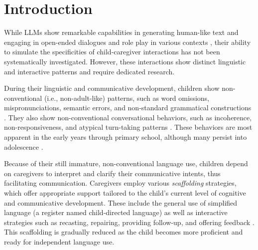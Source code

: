 \graphicspath{{ch5/papers/LLM_benchmark/}}

\section{Introduction}

While LLMs show remarkable capabilities in generating human-like text and engaging in open-ended dialogues and role play in various contexts \citep{feng2024can, yang2024talk2care}, their ability to simulate the specificities of child-caregiver interactions has not been systematically investigated. However, these interactions show distinct linguistic and interactive patterns and require dedicated research. 

During their linguistic and communicative development,  children show non-conventional (i.e., non-adult-like) patterns, such as word omissions, mispronunciations, semantic errors, and non-standard grammatical constructions \citep{bloom1993transition}. They also show non-conventional conversational behaviors, such as incoherence, non-responsiveness, and atypical turn-taking patterns \citep{ninio1996pragmatic}. These behaviors are most apparent in the early years through primary school, although many persist into adolescence \citep{nippold2016later}.  

Because of their still immature, non-conventional language use, children depend on caregivers to interpret and clarify their communicative intents, thus facilitating communication. Caregivers employ various \textit{scaffolding} strategies, which offer appropriate support tailored to the child's current level of cognitive and communicative development. These include the general use of simplified language (a register named child-directed language) as well as interactive strategies such as recasting, repairing, providing follow-up, and offering feedback \citep{berk1995scaffolding, clark2020conversational, snow1977talking,nikolaus2023communicative, soderstrom2007beyond}. This scaffolding is gradually reduced as the child becomes more proficient and ready for independent language use.

